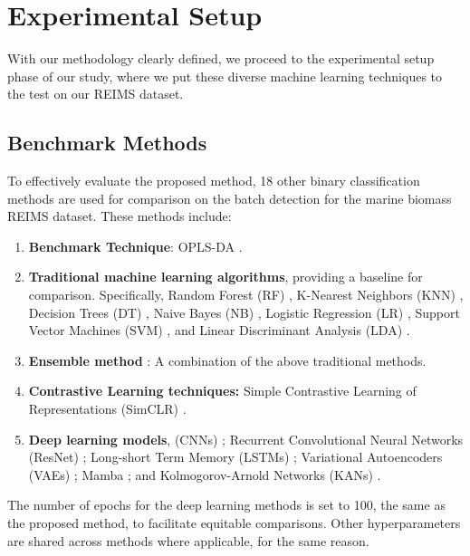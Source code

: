 \section{Experimental Setup}
\label{sec:experimental-setup}

With our methodology clearly defined, we proceed to the experimental setup phase of our study, where we put these diverse machine learning techniques to the test on our REIMS dataset.

\subsection{Benchmark Methods}

To effectively evaluate the proposed method, 18 other binary classification methods are used for comparison on the batch detection for the marine biomass REIMS dataset. These methods include:

\begin{enumerate}
    \item \textbf{Benchmark Technique}: OPLS-DA \citep{Boccard2013}. 
    \item \textbf{Traditional machine learning algorithms}, providing a baseline for comparison. Specifically, Random Forest (RF) \citep{Ho1995}, K-Nearest Neighbors (KNN) \citep{Fix1989}, Decision Trees (DT) \citep{Breiman2017}, Naive Bayes (NB) \citep{Hand2001}, Logistic Regression (LR) \citep{Kleinbaum2002}, Support Vector Machines (SVM) \citep{Cortes1995}, and Linear Discriminant Analysis (LDA) \citep{Balakrishnama1998}.
    \item \textbf{Ensemble method} \citep{Hansen1990}: A combination of the above traditional methods.
    \item \textbf{Contrastive Learning techniques:} Simple Contrastive Learning of Representations (SimCLR) \citep{Chen2020a}.
    \item \textbf{Deep learning models}, (CNNs) \citep{LeCun1989a,LeCun1989b,LeCun1989c,LeCun1998}; Recurrent Convolutional Neural Networks (ResNet) \citep{He2016}; Long-short Term Memory (LSTMs) \citep{Hochreiter1997}; Variational Autoencoders (VAEs) \citep{Kingma2013}; Mamba \citep{Gu2023}; and Kolmogorov-Arnold Networks (KANs) \citep{Liu2024}.
\end{enumerate}

The number of epochs for the deep learning methods is set to 100, the same as the proposed method, to facilitate equitable comparisons. Other hyperparameters are shared across methods where applicable, for the same reason.

